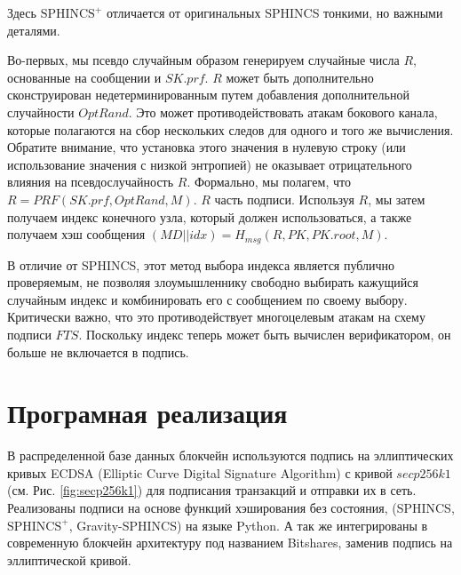 \documentclass[a4paper, 14pt]{extarticle}
\begin{document}
Здесь $\text{SPHINCS}^{+}$ отличается от оригинальных SPHINCS тонкими, но важными деталями.

Во-первых, мы псевдо случайным образом генерируем случайные числа $R$, основанные на сообщении и $SK.prf$. $R$ может быть дополнительно сконструирован недетерминированным путем добавления дополнительной случайности $OptRand$. Это может противодействовать атакам бокового канала, которые полагаются на сбор нескольких следов для одного и того же вычисления. Обратите внимание, что установка этого значения в нулевую строку (или использование значения с низкой энтропией) не оказывает отрицательного влияния на псевдослучайность $R$. Формально, мы полагем, что $R = PRF(SK.prf, OptRand, M)$. $R$ часть подписи. Используя $R$, мы затем получаем индекс конечного узла, который должен использоваться, а также получаем хэш сообщения $(MD||idx) = H_{msg}(R, PK, PK.root, M)$.

В отличие от SPHINCS, этот метод выбора индекса является публично проверяемым, не позволяя злоумышленнику свободно выбирать кажущийся случайным индекс и комбинировать его с сообщением по своему выбору. Критически важно, что это противодействует многоцелевым атакам на схему подписи $FTS$. Поскольку индекс теперь может быть вычислен верификатором, он больше не включается в подпись.
\newpage

\section{Програмная реализация}
В распределенной базе данных блокчейн используются подпись на эллиптических кривых ECDSA (Elliptic Curve Digital Signature Algorithm) с кривой $secp256k1$ (см. Рис. \ref{fig:secp256k1}) для подписания транзакций и отправки их в сеть. Реализованы подписи на основе функций хэширования без состояния, (SPHINCS, $\text{SPHINCS}^{+}$, Gravity-SPHINCS) на языке Python. А так же интегрированы в современную блокчейн архитектуру под названием Bitshares, заменив подпись на эллиптической кривой.
\end{document}
